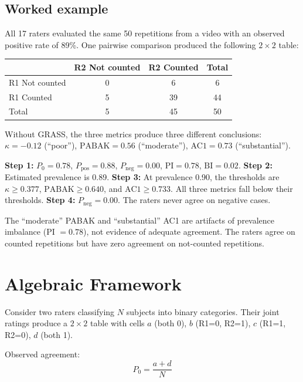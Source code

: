 \documentclass[11pt]{article}
\begin{document}
\subsection*{Worked example}

All 17 raters evaluated the same 50 repetitions from a video with an observed positive rate of 89\%. One pairwise comparison produced the following $2 \times 2$ table:

\begin{table}[h!]
\centering
\begin{tabular}{lcc||c}
\toprule
 & R2 Not counted & R2 Counted & Total \\
\midrule
R1 Not counted & 0 & 6 & 6 \\
R1 Counted & 5 & 39 & 44 \\
\midrule\midrule
Total & 5 & 45 & 50 \\
\bottomrule
\end{tabular}
\end{table}

\noindent Without GRASS, the three metrics produce three different conclusions: $\kappa = -0.12$ (``poor''), $\text{PABAK} = 0.56$ (``moderate''), $\text{AC1} = 0.73$ (``substantial'').

\textbf{Step 1:} $P_0 = 0.78$, $P_{\text{pos}} = 0.88$, $P_{\text{neg}} = 0.00$, $\text{PI} = 0.78$, $\text{BI} = 0.02$. \textbf{Step 2:} Estimated prevalence is 0.89. \textbf{Step 3:} At prevalence 0.90, the thresholds are $\kappa \geq 0.377$, $\text{PABAK} \geq 0.640$, and $\text{AC1} \geq 0.733$. All three metrics fall below their thresholds. \textbf{Step 4:} $P_{\text{neg}} = 0.00$. The raters never agree on negative cases.

The ``moderate'' PABAK and ``substantial'' AC1 are artifacts of prevalence imbalance (PI $= 0.78$), not evidence of adequate agreement. The raters agree on counted repetitions but have zero agreement on not-counted repetitions.

\newpage
\section{Algebraic Framework}
\label{app:algebra}

Consider two raters classifying $N$ subjects into binary categories. Their joint ratings produce a $2 \times 2$ table with cells $a$ (both 0), $b$ (R1=0, R2=1), $c$ (R1=1, R2=0), $d$ (both 1).

Observed agreement:
\begin{equation}
P_0 = \frac{a + d}{N}
\label{eq:p0}
\end{equation}
\end{document}
